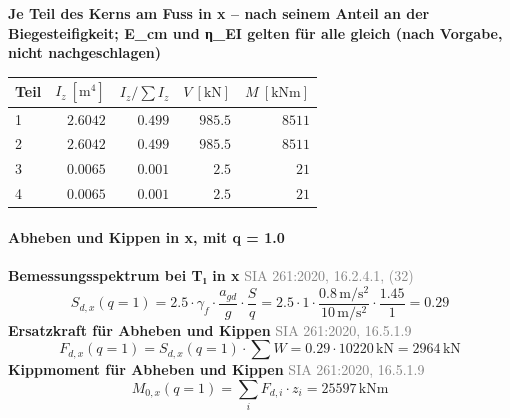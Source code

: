 \documentclass[11pt,a4paper]{article}
\newcommand{\normref}[1]{{\small\textcolor{gray}{#1}}}
\begin{document}
\noindent\textbf{Je Teil des Kerns am Fuss in x – nach seinem Anteil an der Biegesteifigkeit; E\_cm und η\_EI gelten für alle gleich (nach Vorgabe, nicht nachgeschlagen)}
\begin{longtable}{lrrrr}
\hline
Teil & $I_z\ [\mathrm{m}^4]$ & $I_z / \sum I_z$ & $V\ [\mathrm{kN}]$ & $M\ [\mathrm{kNm}]$ \\
\hline
\endhead
1 & $2.6042$ & $0.499$ & $985.5$ & $8511$ \\
2 & $2.6042$ & $0.499$ & $985.5$ & $8511$ \\
3 & $0.0065$ & $0.001$ & $2.5$ & $21$ \\
4 & $0.0065$ & $0.001$ & $2.5$ & $21$ \\
\hline
\end{longtable}
\paragraph{Abheben und Kippen in x, mit q = 1.0}
\noindent\textbf{Bemessungsspektrum bei T₁ in x} \hfill \normref{SIA 261:2020, 16.2.4.1, (32)}
\begin{equation*}
S_{d,x}(q = 1) = 2.5 \cdot \gamma_f \cdot \frac{a_{gd}}{g} \cdot \frac{S}{q} = 2.5 \cdot 1 \cdot \frac{0.8\,\mathrm{m}/\mathrm{s}^{2}}{10\,\mathrm{m}/\mathrm{s}^{2}} \cdot \frac{1.45}{1} = 0.29
\end{equation*}
\noindent\textbf{Ersatzkraft für Abheben und Kippen} \hfill \normref{SIA 261:2020, 16.5.1.9}
\begin{equation*}
F_{d,x}(q = 1) = S_{d,x}(q = 1) \cdot \sum W = 0.29 \cdot 10220\,\mathrm{kN} = 2964\,\mathrm{kN}
\end{equation*}
\noindent\textbf{Kippmoment für Abheben und Kippen} \hfill \normref{SIA 261:2020, 16.5.1.9}
\begin{equation*}
M_{0,x}(q = 1) = \sum_i F_{d,i} \cdot z_i = 25597\,\mathrm{kNm}
\end{equation*}
\end{document}
